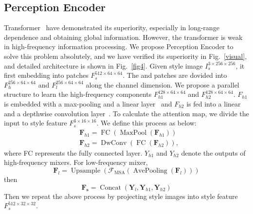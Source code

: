 \documentclass[times,twocolumn,final,authoryear]{elsarticle}
\begin{document}
\subsection{Perception Encoder}
\label{3.1}
Transformer~\citep{liu2021swin,cao2021swin,yu2022metaformer,plizzari2021skeleton,sortino2023transformer,wang2022frame} have demonstrated its superiority, especially in long-range dependence and obtaining global information. However, the transformer is weak in high-frequency information processing. We propose Perception Encoder to solve this problem absolutely, and we have verified its superiority in Fig.~\ref{visual}, and detailed architecture is shown in Fig.~\ref{fig4}. Given style image $I_{s}^{3\times 256 \times 256}$, it first embedding into patches $F_{s}^{512\times 64 \times 64}$. The and patches are dovided into $F_{h}^{256\times 64 \times 64}$ and $F_{l}^{256\times 64 \times 64}$ along the channel dimension. We propose a parallel structure to learn the high-frequency components $F_{h1}^{128\times 64 \times 64}$ and $F_{h2}^{128\times 64 \times 64}$. $F_{h1}$ is embedded with
a max-pooling and a linear layer~\citep{szegedy2015going} and $F_{h2}$ is fed into a linear and a depthwise convolution layer~\citep{chollet2017xception,mamalet2012simplifying,sandler2018mobilenetv2}. To calculate the attention map, we divide the input to style feature  $F_{s}^{3\times 16 \times 16}$. We define this process as below:
\begin{equation}
\begin{aligned}
& \boldsymbol{F}_{h 1}=\operatorname{FC}\left(\operatorname{MaxPool}\left(\boldsymbol{F}_{h 1}\right)\right) \\
& \boldsymbol{F}_{h 2}=\operatorname{DwConv}\left(\operatorname{FC}\left(\boldsymbol{F}_{h 2}\right)\right),
\end{aligned}
\end{equation}
where FC represents the fully connected layer. $Y_{h1}$ and $Y_{h2}$ denote the outputs of high-frequency mixers.
For low-frequency mixer,
\begin{equation}
\boldsymbol{F}_l=\operatorname{Upsample}\left(\mathcal{F}_{\mathrm{MSA}}\left(\operatorname{AvePooling}\left(\boldsymbol{F}_l\right)\right)\right) 
\end{equation}
then
\begin{equation}
\boldsymbol{F}_{\boldsymbol{s}}=\operatorname{Concat}\left(\boldsymbol{Y}_l, \boldsymbol{Y}_{h 1}, \boldsymbol{Y}_{h 2}\right)
\end{equation}
Then we repeat the above process by projecting style images into style feature $F_{s}^{512\times 32 \times 32}$.
\end{document}
